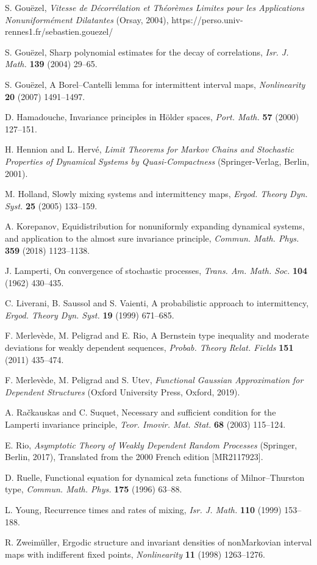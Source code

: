 \documentclass{ws-sd}
\begin{document}
\begin{thebibliography}{0}
S. Gou\"ezel, \emph{Vitesse de D\'ecorr\'elation et Th\'eor\`emes Limites pour les Applications Nonuniform\'ement Dilatantes} (Orsay, 2004), https://perso.univ-rennes1.fr/sebastien.gouezel/

S. Gou\"ezel, Sharp polynomial estimates for the decay of correlations, \textit{Isr. J. Math.} \textbf{139} (2004) 29--65.

S. Gou\"ezel, A Borel--Cantelli lemma for intermittent interval maps, \textit{Nonlinearity} \textbf{20} (2007) 1491--1497.

D. Hamadouche, Invariance principles in H\"older spaces, \textit{Port. Math.} \textbf{57} (2000) 127--151.

H. Hennion and L. Herv\'e, \textit{Limit Theorems for Markov Chains and Stochastic Properties of Dynamical Systems by Quasi-Compactness} (Springer-Verlag, Berlin, 2001).

M. Holland, Slowly mixing systems and intermittency maps, \textit{Ergod. Theory Dyn. Syst.} \textbf{25} (2005) 133--159.

A. Korepanov, Equidistribution for nonuniformly expanding dynamical systems, and application to the almost sure invariance principle, \textit{Commun. Math. Phys.} \textbf{359} (2018) 1123--1138.

J. Lamperti, On convergence of stochastic processes, \textit{Trans. Am. Math. Soc.} \textbf{104} (1962) 430--435.

C. Liverani, B. Saussol and S. Vaienti, A probabilistic approach to intermittency, \textit{Ergod. Theory Dyn. Syst.} \textbf{19} (1999) 671--685.

F. Merlev\`ede, M. Peligrad and E. Rio, A Bernstein type inequality and moderate deviations for weakly dependent sequences, \textit{Probab. Theory Relat. Fields} \textbf{151} (2011) 435--474.

F. Merlev\`ede, M. Peligrad and S. Utev, \textit{Functional Gaussian Approximation for Dependent Structures} (Oxford University Press, Oxford, 2019).

A. Ra\v ckauskas and C. Suquet, Necessary and sufficient condition for the Lamperti invariance principle, \textit{Teor. Imovir. Mat. Stat.} \textbf{68} (2003) 115--124.

E. Rio, \textit{Asymptotic Theory of Weakly Dependent Random Processes} (Springer, Berlin, 2017), Translated from the 2000 French edition [MR2117923].

D. Ruelle, Functional equation for dynamical zeta functions of Milnor--Thurston type, \textit{Commun. Math. Phys.} \textbf{175} (1996) 63--88.

L. Young, Recurrence times and rates of mixing, \textit{Isr. J. Math.} \textbf{110} (1999) 153--188.

R. Zweim\"uller, Ergodic structure and invariant densities of nonMarkovian interval maps with indifferent fixed points, \textit{Nonlinearity} \textbf{11} (1998) 1263--1276.
\end{thebibliography}
\end{document}
